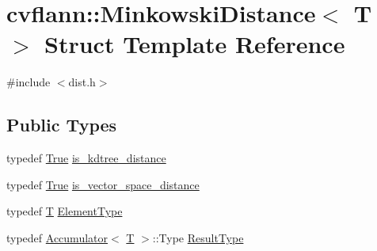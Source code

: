 \hypertarget{structcvflann_1_1MinkowskiDistance}{\section{cvflann\-:\-:Minkowski\-Distance$<$ T $>$ Struct Template Reference}
\label{structcvflann_1_1MinkowskiDistance}
}


{\ttfamily \#include $<$dist.\-h$>$}

\subsection*{Public Types}
\begin{DoxyCompactItemize}
\item 
typedef \hyperlink{classcvflann_1_1True}{True} \hyperlink{structcvflann_1_1MinkowskiDistance_ab0f43baaf0a36a5598a88b2ee55a3e01}{is\-\_\-kdtree\-\_\-distance}
\item 
typedef \hyperlink{classcvflann_1_1True}{True} \hyperlink{structcvflann_1_1MinkowskiDistance_a84506bd48e3b43e87d56e9b60d9fb464}{is\-\_\-vector\-\_\-space\-\_\-distance}
\item 
typedef \hyperlink{calib3d_8hpp_a3efb9551a871ddd0463079a808916717}{T} \hyperlink{structcvflann_1_1MinkowskiDistance_ade76f2298b0f811a466afdf72b18846b}{Element\-Type}
\item 
typedef \hyperlink{structcvflann_1_1Accumulator}{Accumulator}$<$ \hyperlink{calib3d_8hpp_a3efb9551a871ddd0463079a808916717}{T} $>$\-::Type \hyperlink{structcvflann_1_1MinkowskiDistance_a21baf56e06b45cdea5de1530c2e7c0ec}{Result\-Type}
\end{DoxyCompactItemize}
